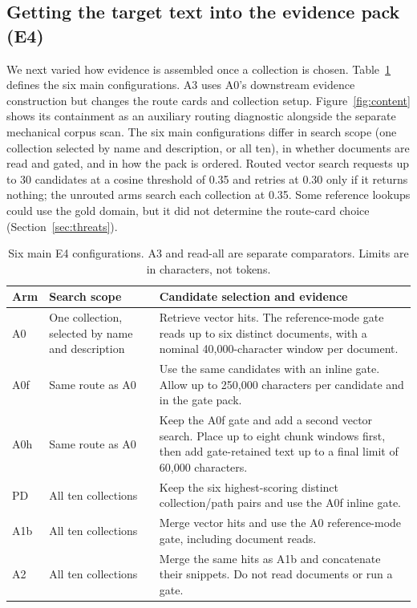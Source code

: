 \subsection{Getting the target text into the evidence pack (E4)}
\label{sec:ladder-opt}
\label{sec:exp-e4}
We next varied how evidence is assembled once a collection is chosen.
Table~\ref{tab:ablation-configs} defines the six main configurations.
A3 uses A0's downstream evidence construction but changes the route cards
and collection setup. Figure~\ref{fig:content} shows its containment as an
auxiliary routing diagnostic alongside the separate mechanical corpus scan.
The six main configurations differ
in search scope (one collection selected by name and description, or all
ten), in whether documents are read and gated, and in how the pack is
ordered. Routed vector search requests up to 30 candidates at a cosine
threshold of 0.35 and retries at 0.30 only if it returns nothing; the
unrouted arms search each collection at 0.35. Some reference lookups could
use the gold domain, but it did not determine the route-card choice
(Section~\ref{sec:threats}).

\begin{table}[!ht]
\centering
\small
\setlength{\tabcolsep}{3pt}
\renewcommand{\arraystretch}{1.16}
\caption{Six main E4 configurations. A3 and read-all are separate
comparators. Limits are in characters, not tokens.}
\label{tab:ablation-configs}
\begin{tabular}{@{}l>{\raggedright\arraybackslash}p{}>{\raggedright\arraybackslash}p{}@{}}
\toprule
Arm & Search scope & Candidate selection and evidence\\
\midrule
A0 & One collection, selected by name and description & Retrieve vector hits. The reference-mode gate reads up to six distinct documents, with a nominal 40{,}000-character window per document.\\
A0f & Same route as A0 & Use the same candidates with an inline gate. Allow up to 250{,}000 characters per candidate and in the gate pack.\\
A0h & Same route as A0 & Keep the A0f gate and add a second vector search. Place up to eight chunk windows first, then add gate-retained text up to a final limit of 60{,}000 characters.\\
PD & All ten collections & Keep the six highest-scoring distinct collection/path pairs and use the A0f inline gate.\\
A1b & All ten collections & Merge vector hits and use the A0 reference-mode gate, including document reads.\\
A2 & All ten collections & Merge the same hits as A1b and concatenate their snippets. Do not read documents or run a gate.\\
\bottomrule
\end{tabular}
\end{table}

